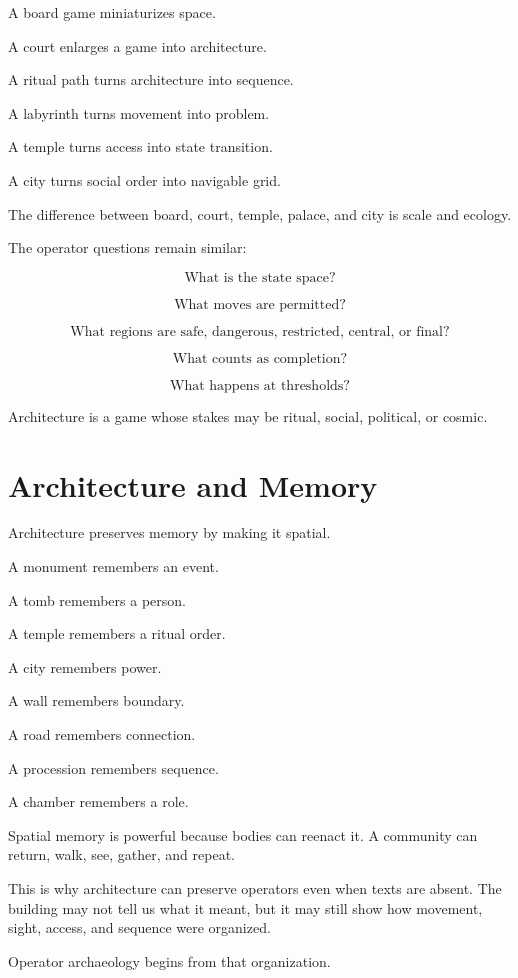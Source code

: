 \documentclass[11pt]{book}
\begin{document}
A board game miniaturizes space.

A court enlarges a game into architecture.

A ritual path turns architecture into sequence.

A labyrinth turns movement into problem.

A temple turns access into state transition.

A city turns social order into navigable grid.

The difference between board, court, temple, palace, and city is scale and ecology.

The operator questions remain similar:

\[
\text{What is the state space?}
\]

\[
\text{What moves are permitted?}
\]

\[
\text{What regions are safe, dangerous, restricted, central, or final?}
\]

\[
\text{What counts as completion?}
\]

\[
\text{What happens at thresholds?}
\]

Architecture is a game whose stakes may be ritual, social, political, or cosmic.

\section{Architecture and Memory}

Architecture preserves memory by making it spatial.

A monument remembers an event.

A tomb remembers a person.

A temple remembers a ritual order.

A city remembers power.

A wall remembers boundary.

A road remembers connection.

A procession remembers sequence.

A chamber remembers a role.

Spatial memory is powerful because bodies can reenact it. A community can return, walk, see, gather, and repeat.

This is why architecture can preserve operators even when texts are absent. The building may not tell us what it meant, but it may still show how movement, sight, access, and sequence were organized.

Operator archaeology begins from that organization.
\end{document}
